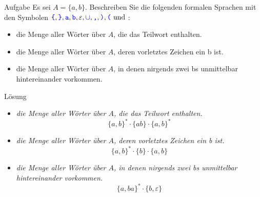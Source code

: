 \begin{frame}{Aufgabe }
	Es sei $A = \{a, b\}$. Beschreiben Sie die folgenden formalen Sprachen mit den Symbolen $\hbox{\textcolor{blue}{\texttt{\{}}}, \hbox{\textcolor{blue}{\texttt{\}}}}, \hbox{\textcolor{blue}{\texttt{a}}}, \hbox{\textcolor{blue}{\texttt{b}}}, \varepsilon, 
	\hbox{\textcolor{blue}{$\mathtt{\cup}$}}, 
	\hbox{\textcolor{blue}{\texttt{,}}} , \hbox{\textcolor{blue}{\texttt{)}}}, \hbox{\textcolor{blue}{\texttt{(}}} \text{ und } 
	$:
	\begin{itemize}
		\item die Menge aller Wörter über $A$, die das Teilwort  enthalten.
		\item die Menge aller Wörter über $A$, deren vorletztes Zeichen ein \word b ist.
		\item die Menge aller Wörter über $A$, in denen nirgends zwei \word bs unmittelbar hintereinander vorkommen.
	\end{itemize}
\end{frame}

\begin{frame}{Lösung}
	\begin{itemize}
		\item \textit{die Menge aller Wörter über $A$, die das Teilwort  enthalten.}  \pause
			$$\{a,b\}^\ast \cdot \{ab\} \cdot \{a,b\}^\ast$$ \pause
		\item \textit{die Menge aller Wörter über $A$, deren vorletztes Zeichen ein b ist.}  \pause
			$$\{a,b\}^\ast \cdot \{b\} \cdot \{a,b\}$$ \pause
		\item \textit{die Menge aller Wörter über $A$, in denen nirgends zwei \word bs unmittelbar hintereinander vorkommen.}  \pause
			$$\{a, ba\}^\ast \cdot \{b, \varepsilon \}$$
	\end{itemize}
\end{frame}

